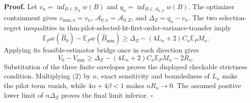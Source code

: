 \textbf{Proof.}
Let \(v_n=\inf_{B\in\mathcal B_Z}w(B)\) and \(q_n=\inf_{B\in\mathcal A_{0,Z}}w(B)\).  The optimizer containment gives \(v_{\mathrm{mm},\overline a}=v_n\), \(\mathcal A_{0,\overline a}=\mathcal A_{0,Z}\), and \(\Delta_Z=q_n-v_n\).  The two selection-regret inequalities in thm:pilot-selected-ht-first-order-variance-transfer imply
\[
\mathbb E_Pw(\widehat B_0)-\mathbb E_Pw(\widehat B_{\mathrm{mm}})
\ge\Delta_Z-(4L_n+2)C_n\mathbb E_PM_n.
\tag{1}
\]
Applying its feasible-estimator bridge once in each direction gives
\[
V_0-V_{\mathrm{mm}}
\ge\Delta_Z-(4L_n+2)C_n\mathbb E_PM_n-2R_n.
\tag{2}
\]
Substitution of the three finite envelopes proves the displayed checkable strictness condition.  Multiplying (2) by \(n\), exact sensitivity and boundedness of \(L_n\) make the pilot term vanish, while \(4\alpha+4\beta<1\) makes \(nR_n\to0\).  The assumed positive lower limit of \(n\Delta_Z\) proves the final limit inferior. \(\square\)